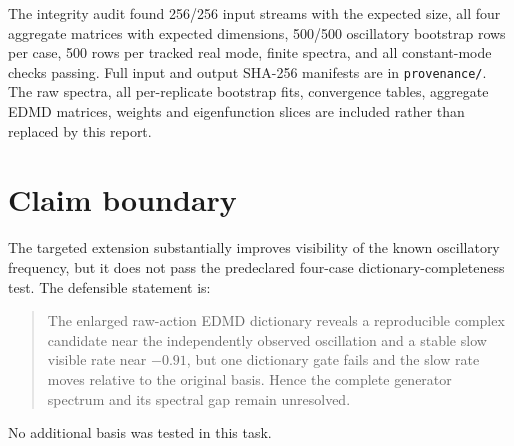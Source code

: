 \documentclass[11pt]{article}
\begin{document}
The integrity audit found 256/256 input streams with the expected size,
all four aggregate matrices with expected dimensions, 500/500 oscillatory
bootstrap rows per case, 500 rows per tracked real mode, finite spectra, and
all constant-mode checks passing. Full input and output SHA-256 manifests are
in \texttt{provenance/}. The raw spectra, all per-replicate bootstrap fits,
convergence tables, aggregate EDMD matrices, weights and eigenfunction slices
are included rather than replaced by this report.

\section{Claim boundary}

The targeted extension substantially improves visibility of the known
oscillatory frequency, but it does not pass the predeclared four-case
dictionary-completeness test. The defensible statement is:
\begin{quote}
The enlarged raw-action EDMD dictionary reveals a reproducible complex
candidate near the independently observed oscillation and a stable slow
visible rate near $-0.91$, but one dictionary gate fails and the slow rate moves
relative to the original basis. Hence the complete generator spectrum and its
spectral gap remain unresolved.
\end{quote}
No additional basis was tested in this task.
\end{document}
